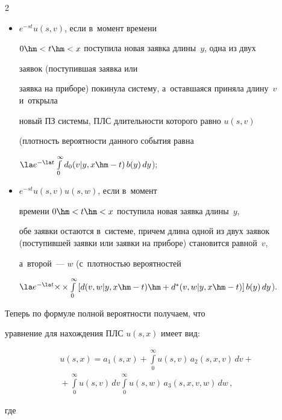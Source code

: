 \begin{multicols}{2}
\begin{itemize}
\item $e^{-s t} u(s,v)$, если в~момент времени


$0\hm<t\hm<x$ поступила новая заявка длины~$y$, одна из двух


заявок (поступившая заявка или


заявка на приборе) покинула систему, а~оставшаяся приняла длину~$v$ и~открыла


новый ПЗ системы, ПЛС длительности которого равно $u(s,v)$


(плот\-ность вероятности данного события равна


$ \la e^{-\la t} \int\limits_0^\infty d_0(v|y,x\hm-t)\, b(y)\, dy$);





\item  $e^{-s t} u(s,v) u(s,w)$, если в~момент


времени $0\hm<t\hm<x$ поступила новая заявка длины~$y$,


обе заявки остаются в~системе, причем длина одной из двух заявок (поступившей заявки или заявки на приборе) становится равной~$v$,


а~второй~--- $w$ (с~плот\-ностью вероятностей


$\la e^{-\la t}\times$\linebreak $ \times\int\limits_0^\infty \left[d(v,w|y,x\hm-t)\hm+d^*(v,w|y,x\hm-t)\right] b(y)\, dy $).


\end{itemize}





Теперь по формуле полной вероятности получаем, что


уравнение для нахождения ПЛС $u(s,x)$ имеет вид:


\begin{multline}


u(s,x) = a_1(s,x) + \int\limits_0^\infty u(s,v)\, a_2(s,x,v)\,dv


+ {}\\


{}+\int\limits_0^\infty u(s,v)\, dv \int\limits_0^\infty u(s,w)\, a_3(s,x,v,w)\,dw


\,,


\label{e1-m}


\end{multline}


где


\begin{multline*}



\end{multline*}
\end{multicols}
